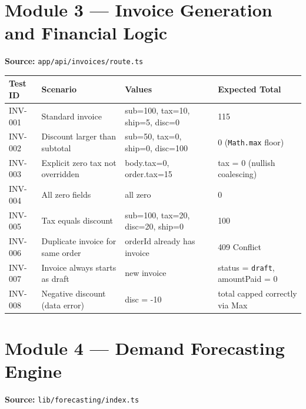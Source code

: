 \documentclass[12pt,a4paper]{report}
\begin{document}
\section{Module 3 --- Invoice Generation and Financial Logic}

\textbf{Source:} \texttt{app/api/invoices/route.ts}

\begin{longtable}{p{}p{}p{}p{}}
    \toprule
    \textbf{Test ID} & \textbf{Scenario} & \textbf{Values} & \textbf{Expected Total} \\
    \midrule
    \endhead
    INV-001 & Standard invoice & sub=100, tax=10, ship=5, disc=0 & 115 \\
    INV-002 & Discount larger than subtotal & sub=50, tax=0, ship=0, disc=100 & 0 (\texttt{Math.max} floor) \\
    INV-003 & Explicit zero tax not overridden & body.tax=0, order.tax=15 & tax = 0 (nullish coalescing) \\
    INV-004 & All zero fields & all zero & 0 \\
    INV-005 & Tax equals discount & sub=100, tax=20, disc=20, ship=0 & 100 \\
    INV-006 & Duplicate invoice for same order & orderId already has invoice & 409 Conflict \\
    INV-007 & Invoice always starts as draft & new invoice & status = \texttt{draft}, amountPaid = 0 \\
    INV-008 & Negative discount (data error) & disc = -10 & total capped correctly via Max \\
    \bottomrule
\end{longtable}

\section{Module 4 --- Demand Forecasting Engine}

\textbf{Source:} \texttt{lib/forecasting/index.ts}
\end{document}
